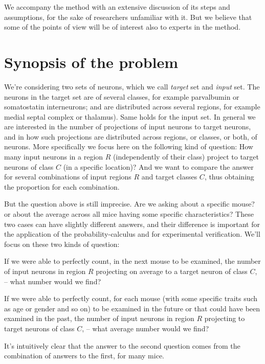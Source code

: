 \documentclass[\ifafour a4paper,12pt,\else a5paper,10pt,\fi%
onecolumn,oneside,article,%
british%
]{memoir}
\theoremstyle{remark}
\theoremstyle{innote}
\renewcommand*{\|}[1][]{\nonscript\,#1\vert\nonscript\;\mathopen{}}
\begin{document}
We accompany the method with an extensive discussion of its steps and
assumptions, for the sake of researchers unfamiliar with it. But we believe
that some of the points of view will be of interest also to experts in the
method.


\section{Synopsis of the problem}
\label{sec:synopsis}

We're considering two sets of neurons, which we call \emph{target} set and
\emph{input} set. The neurons in the target set are of several classes, for
example parvalbumin or somatostatin interneurons; and are distributed
across several regions, for example medial septal complex or thalamus).
Same holds for the input set. In general we are interested in the number of
projections of input neurons to target neurons, and in how such projections
are distributed across regions, or classes, or both, of neurons. More
specifically we focus here on the following kind of question: How many
input neurons in a region $R$ (independently of their class) project to
target neurons of class $C$ (in a specific location)? And we want to
compare the answer for several combinations of input regions $R$ and target
classes $C$, thus obtaining the proportion for each combination.

But the question above is still imprecise. Are we asking about a specific
mouse? or about the average across all mice having some specific
characteristics? These two cases can have slightly different answers, and
their difference is important for the application of the
probability-calculus and for experimental verification. We'll focus on
these two kinds of question:
\begin{description}[font=\mdseries]
\item[Individual:] If we were able to perfectly count, in the next mouse to
  be examined, the number of input neurons in region $R$ projecting on
  average to a target neuron of class $C$, -- what number would we find?
\item[Collective or average:] If we were able to perfectly count, for each
  mouse (with some specific traits such as age or gender and so on) to be
  examined in the future or that could have been examined in the past, the
  number of input neurons in region $R$ projecting to target neurons of
  class $C$, -- what average number would we find?
\end{description}
It's intuitively clear that the answer to the second question comes from
the combination of answers to the first, for many mice.
\end{document}
